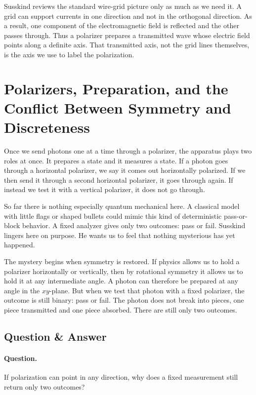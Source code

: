 Susskind reviews the standard wire-grid picture only as much as we need it. A grid can support currents in one direction and not in the orthogonal direction. As a result, one component of the electromagnetic field is reflected and the other passes through. Thus a polarizer prepares a transmitted wave whose electric field points along a definite axis. That transmitted axis, not the grid lines themselves, is the axis we use to label the polarization.

\section{Polarizers, Preparation, and the Conflict Between Symmetry and Discreteness}

Once we send photons one at a time through a polarizer, the apparatus plays two roles at once. It prepares a state and it measures a state. If a photon goes through a horizontal polarizer, we say it comes out horizontally polarized. If we then send it through a second horizontal polarizer, it goes through again. If instead we test it with a vertical polarizer, it does not go through.

So far there is nothing especially quantum mechanical here. A classical model with little flags or shaped bullets could mimic this kind of deterministic pass-or-block behavior. A fixed analyzer gives only two outcomes: pass or fail. Susskind lingers here on purpose. He wants us to feel that nothing mysterious has yet happened.

The mystery begins when symmetry is restored. If physics allows us to hold a polarizer horizontally or vertically, then by rotational symmetry it allows us to hold it at any intermediate angle. A photon can therefore be prepared at any angle in the \(xy\)-plane. But when we test that photon with a fixed polarizer, the outcome is still binary: pass or fail. The photon does not break into pieces, one piece transmitted and one piece absorbed. There are still only two outcomes.

\subsection{Question \& Answer}

\paragraph{Question.}
If polarization can point in any direction, why does a fixed measurement still return only two outcomes?


